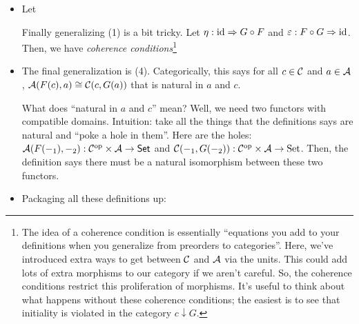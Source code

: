 \begin{itemize}
  \item Let 

  Finally generalizing (1) is a bit tricky. 
  Let $\eta : \operatorname{id} \Rightarrow G \circ F$ 
  and $\varepsilon : F \circ G \Rightarrow \operatorname{id}$. 
  Then, we have \emph{coherence conditions}\footnote{
    The idea of a coherence condition is essentially 
    ``equations you add to your definitions when you generalize 
    from preorders to categories''. Here, we've introduced 
    extra ways to get between $\mathcal C$ and $\mathcal A$ via 
    the units. This could add lots of extra morphisms 
    to our category if we aren't careful. So, the coherence 
    conditions restrict this proliferation of morphisms. 
    It's useful to think about what happens without these 
    coherence conditions; the easiest is to see that 
    initiality is violated in the category $c \downarrow G$.
  }

  \item The final generalization is (4). Categorically,
  this says for all $c \in \mathcal C$ and $a \in \mathcal A$, 
  $\mathcal A(F(c), a) \cong \mathcal C(c, G(a))$ that is natural in 
  $a$ and $c$.

  What does ``natural in $a$ and $c$'' mean? Well, we need two functors with
  compatible domains.  Intuition: take all the things that the definitions says 
  are natural and ``poke a hole in them''. Here are the holes: $\mathcal A(F(-_1),
  -_2) : \mathcal C^\text{op} \times \mathcal A \to \mathsf{Set}$ and 
  $\mathcal C(-_1, G(-_2)) : \mathcal C^\text{op} \times \mathcal A \to \text{Set}$.
  Then, the definition says there must be a natural 
  isomorphism between these two functors.

  \item Packaging all these definitions up:

\end{itemize}

